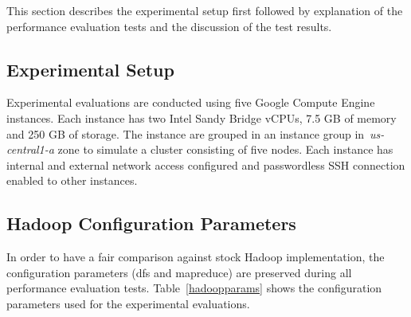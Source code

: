 \label{results}
This section describes the experimental setup first followed by explanation of the
performance evaluation tests and the discussion of the test results.

\subsection{Experimental Setup}
Experimental evaluations are conducted using five Google Compute Engine~\cite{gce}
instances. Each instance has two Intel Sandy Bridge vCPUs, 7.5 GB of memory and 250 GB
of storage. The instance are grouped in an instance group in~\textit{us-central1-a} zone
to simulate a cluster consisting of five nodes. Each instance has internal and external
network access configured and passwordless SSH connection enabled to other instances.

\subsection{Hadoop Configuration Parameters}
\label{hadoopconfs}
In order to have a fair comparison against stock Hadoop implementation, the configuration
parameters (dfs and mapreduce) are preserved during all performance evaluation tests.
Table~\ref{hadoopparams} shows the configuration parameters used for the experimental evaluations.

\begin{table}[!htbp]
 \begin{center}
 \end{center}
 \caption{Hadoop Configuration Parameters}
 \label{hadoopparams}
\end{table}

